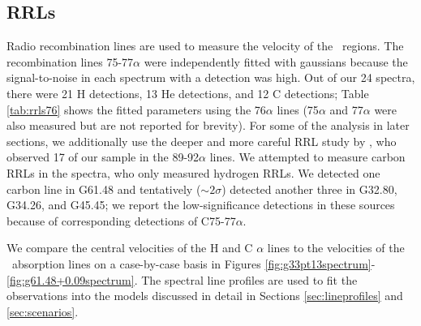\subsection{RRLs}
Radio recombination lines are used to measure the velocity of the \uchii\ regions.
The recombination lines 75-77$\alpha$ were independently fitted with gaussians
because the signal-to-noise in each spectrum with a detection was high. Out of our 24
spectra, there were 21 H detections, 13 He detections, and 12 C detections;
Table \ref{tab:rrls76} shows the fitted parameters using the 76$\alpha$ lines
(75$\alpha$ and 77$\alpha$ were also measured but are not reported for
brevity).  For some of the analysis in later sections, we additionally use the
deeper and more careful RRL study by \citet{Roshi2005}, who observed 17 of our
sample in the 89-92$\alpha$ lines.  We attempted to measure carbon RRLs in the
\citet{Araya2002} spectra, who only measured hydrogen RRLs.  We detected one
carbon line in G61.48 and tentatively ($\sim2\sigma$) detected another three in
G32.80, G34.26, and G45.45; we report the low-significance detections in these
sources because of corresponding detections of C75-77$\alpha$.

We compare the central velocities of the H and C $\alpha$ lines to the
velocities of the \formaldehyde\ absorption lines on a case-by-case basis in
Figures \ref{fig:g33pt13spectrum}-\ref{fig:g61.48+0.09spectrum}.  The spectral line
profiles are used to fit the observations into the models discussed in detail
in Sections \ref{sec:lineprofiles} and \ref{sec:scenarios}.



%

